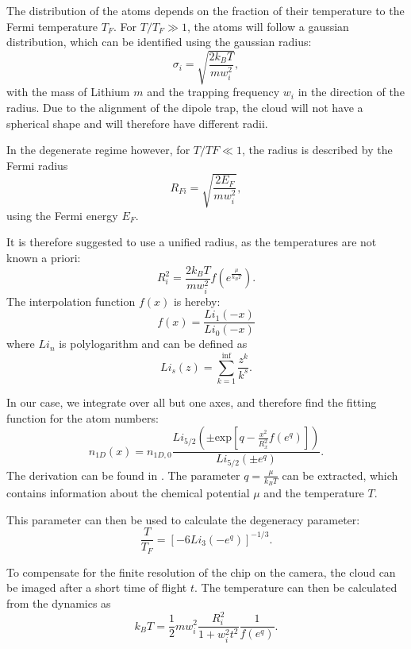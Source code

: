 The distribution of the atoms depends on the fraction of their temperature to the Fermi temperature\cite{Ketterle2008} $T_F$. For $T/T_F \gg 1$, the atoms will follow a gaussian distribution, which can be identified using the gaussian radius:
\begin{equation}
\sigma _i = \sqrt{\frac{2k_BT}{mw_i^2}},
\end{equation}
with the mass of Lithium $m$ and the trapping frequency $w_i$ in the direction of the radius. Due to the alignment of the dipole trap, the cloud will not have a spherical shape and will therefore have different radii.

In the degenerate regime however, for $T/TF \ll 1$, the radius is described by the Fermi radius
\begin{equation}
R_{Fi} = \sqrt{\frac{2E_F}{mw_i^2}},
\end{equation}
using the Fermi energy $E_F$.

It is therefore suggested to use a unified radius, as the temperatures are not known a priori:
\begin{equation}
R_i^2 = \frac{2k_BT}{mw_i^2}f( e^{\frac{\mu}{k_BT}}).
\end{equation}
The interpolation function $f(x)$ is hereby:
\begin{equation}
f(x) = \frac{Li_1(-x)}{Li_0(-x)}
\end{equation}
where $Li_n$ is polylogarithm and can be defined as
\begin{equation}
Li_s(z) = \sum_{k=1}^{\inf} \frac{z^k}{k^s}.
\end{equation}

In our case, we integrate over all but one axes, and therefore find the fitting function for the atom numbers:
\begin{equation}
\label{eq:n1d}
n_{1D}(x) = n_{1D,0}\frac{Li_{5/2}\left( \pm \mathrm{exp}\left[ q-\frac{x^2}{R_x^2}f(e^q)\right] \right)}{Li_{5/2}(\pm e^q)}.
\end{equation}
The derivation can be found in \cite{Ketterle2008}. The parameter $q=\frac{\mu}{k_BT}$ can be extracted, which contains information about the chemical potential $\mu$ and the temperature $T$.

This parameter can then be used to calculate the degeneracy parameter:
\begin{equation}
\frac{T}{T_F} = \left[ -6 Li_3(-e^q) \right]^{-1/3}.
\end{equation}

To compensate for the finite resolution of the chip on the camera, the cloud can be imaged after a short time of flight $t$. The temperature can then be calculated from the dynamics as
\begin{equation}
k_BT = \frac{1}{2} mw_i^2 \frac{R_i^2}{1+w_i^2t^2}\frac{1}{f(e^q)}.
\end{equation}


